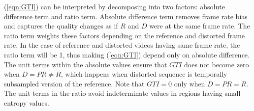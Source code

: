 \documentclass[journal]{IEEEtran}
\begin{document}
(\ref{eqn:GTI}) can be interpreted by decomposing into two factors: absolute difference term and ratio term. Absolute difference term removes frame rate bias and captures the quality changes as if $R$ and $D$ were at the same frame rate. The ratio term weights these factors depending on the reference and distorted frame rate. In the case of reference and distorted videos having same frame rate, the ratio term will be 1, thus making (\ref{eqn:GTI}) depend only on absolute difference. The unit terms within the absolute values ensure that $GTI$ does not become zero when $D = PR \neq R$, which happens when distorted sequence is temporally subsampled version of the reference. Note that $GTI = 0$ only when $D = PR = R$. The unit terms in the ratio avoid indeterminate values in regions having small entropy values.

\vspace{-7pt}
\end{document}
